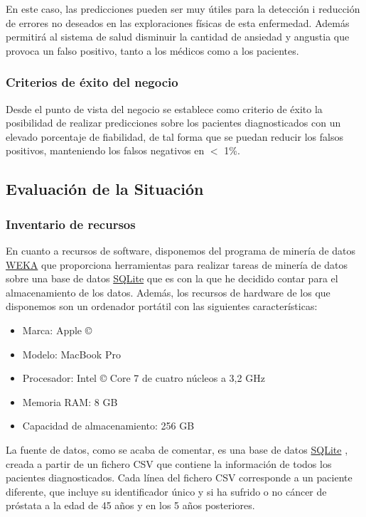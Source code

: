 \documentclass{article}
\begin{document}
En este caso, las predicciones pueden ser muy útiles para la detección i reducción de errores no deseados en las exploraciones físicas de esta enfermedad. Además permitirá al sistema de salud disminuir la cantidad de ansiedad y angustia
que provoca un falso positivo, tanto a los médicos como a los pacientes.
	
\subsubsection{Criterios de éxito del negocio}
Desde el punto de vista del negocio se establece como criterio de éxito la posibilidad de realizar predicciones sobre los pacientes diagnosticados con un elevado porcentaje de fiabilidad, de tal forma que se puedan reducir los falsos positivos, manteniendo los falsos negativos en $<$ 1\%.

\subsection{Evaluación de la Situación}

\subsubsection{Inventario de recursos}\label{Inventario de recursos}
En cuanto a recursos de software, disponemos del programa de minería de datos \href{https://www.cs.waikato.ac.nz/~ml/weka/}{WEKA} que proporciona herramientas para realizar tareas de minería de datos sobre una base de datos \href{https://www.sqlite.org/copyright.html}{SQLite} que es con la que he decidido contar para el almacenamiento de los datos. Además, los recursos de hardware de los que disponemos son un ordenador portátil con las siguientes características:

\begin{itemize}
	\item Marca: Apple ©
	\item Modelo: MacBook Pro
	\item Procesador: Intel © Core 7 de cuatro núcleos a 3,2 GHz
	\item Memoria RAM: 8 GB
	\item Capacidad de almacenamiento: 256 GB
\end{itemize}

La fuente de datos, como se acaba de comentar, es una base de datos \href{https://www.sqlite.org/copyright.html}{SQLite} , creada a partir de un fichero CSV que contiene la información de todos los pacientes diagnosticados. Cada línea del fichero CSV corresponde a un paciente diferente, que incluye su identificador único y si ha sufrido o no cáncer de próstata a la edad de 45 años y en los 5 años posteriores.
\end{document}
